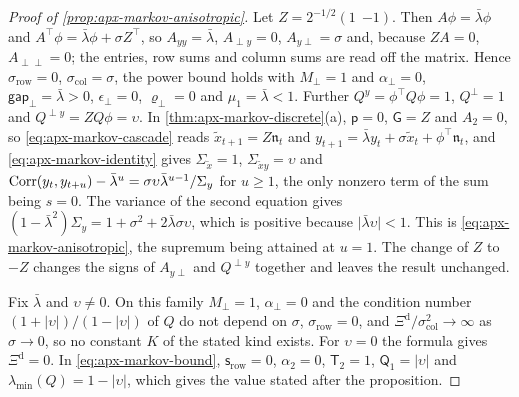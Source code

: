 \begin{proof}[Proof of \cref{prop:apx-markov-anisotropic}]
Let $Z=2^{-1/2}(1\ \ {-1})$. Then $A\phi=\bar\lambda\phi$ and $A^\top\phi=\bar\lambda\phi+\sigma Z^\top$, so $A_{yy}=\bar\lambda$, $A_{\perp y}=0$, $A_{y\perp}=\sigma$ and, because $ZA=0$, $A_{\perp\perp}=0$; the entries, row sums and column sums are read off the matrix. Hence $\sigma_{\mathrm{row}}=0$, $\sigma_{\mathrm{col}}=\sigma$, the power bound holds with $M_\perp=1$ and $\alpha_\perp=0$, $\mathsf{gap}_\perp=\bar\lambda>0$, $\epsilon_\perp=0$, $\varrho_\perp=0$ and $\mu_1=\bar\lambda<1$. Further $Q^y=\phi^\top Q\phi=1$, $Q^\perp=1$ and $Q^{\perp y}=ZQ\phi=\upsilon$. In \cref{thm:apx-markov-discrete}(a), $\mathsf p=0$, $\mathsf G=Z$ and $A_2=0$, so \eqref{eq:apx-markov-cascade} reads $\tilde x_{t+1}=Z\mathfrak n_t$ and $y_{t+1}=\bar\lambda y_t+\sigma\tilde x_t+\phi^\top\mathfrak n_t$, and \eqref{eq:apx-markov-identity} gives $\Sigma_{\tilde x}=1$, $\Sigma_{\tilde xy}=\upsilon$ and $\operatorname{Corr}(y_t,y_{t+u})-\bar\lambda^u=\sigma\upsilon\bar\lambda^{u-1}/\Sigma_y$ for $u\ge1$, the only nonzero term of the sum being $s=0$. The variance of the second equation gives $(1-\bar\lambda^2)\Sigma_y=1+\sigma^2+2\bar\lambda\sigma\upsilon$, which is positive because $\lvert\bar\lambda\upsilon\rvert<1$. This is \eqref{eq:apx-markov-anisotropic}, the supremum being attained at $u=1$. The change of $Z$ to $-Z$ changes the signs of $A_{y\perp}$ and $Q^{\perp y}$ together and leaves the result unchanged.

Fix $\bar\lambda$ and $\upsilon\ne0$. On this family $M_\perp=1$, $\alpha_\perp=0$ and the condition number $(1+\lvert\upsilon\rvert)/(1-\lvert\upsilon\rvert)$ of $Q$ do not depend on $\sigma$, $\sigma_{\mathrm{row}}=0$, and $\Xi^{\mathrm d}/\sigma_{\mathrm{col}}^2\to\infty$ as $\sigma\to0$, so no constant $K$ of the stated kind exists. For $\upsilon=0$ the formula gives $\Xi^{\mathrm d}=0$. In \eqref{eq:apx-markov-bound}, $\mathsf s_{\mathrm{row}}=0$, $\alpha_2=0$, $\mathsf T_2=1$, $\mathsf Q_1=\lvert\upsilon\rvert$ and $\lambda_{\min}(Q)=1-\lvert\upsilon\rvert$, which gives the value stated after the proposition.
\end{proof}

